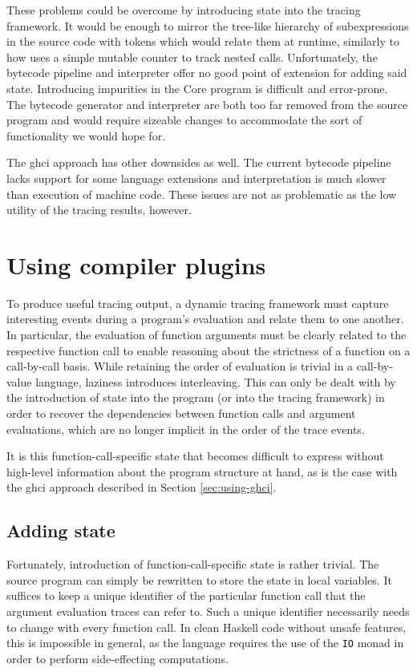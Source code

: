 \documentclass[thesis=B,english]{FITthesis}[2019/12/23]
\newcommand{\hsType}[1]{\texttt{#1}}
\begin{document}
These problems could be overcome by introducing state into the tracing
framework. It would be enough to mirror the tree-like hierarchy of
subexpressions in the source code with tokens which would relate them at
runtime, similarly to how  uses a simple mutable counter to
track nested calls. Unfortunately, the bytecode pipeline and interpreter offer
no good point of extension for adding said state. Introducing impurities in the
Core program is difficult and error-prone. The bytecode generator and
interpreter are both too far removed from the source program and would require
sizeable changes to accommodate the sort of functionality we would hope for.

The \acrshort{ghci} approach has other downsides as well. The current bytecode
pipeline lacks support for some language extensions and interpretation is much
slower than execution of machine code. These issues are not as problematic as
the low utility of the tracing results, however.

\section{Using compiler plugins}
To produce useful tracing output, a dynamic tracing framework must capture
interesting events during a program's evaluation and relate them to one
another. In particular, the evaluation of function arguments must be clearly
related to the respective function call to enable reasoning about the
strictness of a function on a call-by-call basis. While retaining the order of
evaluation is trivial in a call-by-value language, laziness introduces
interleaving. This can only be dealt with by the introduction of state into the
program (or into the tracing framework) in order to recover the dependencies
between function calls and argument evaluations, which are no longer implicit
in the order of the trace events.

It is this function-call-specific state that becomes difficult to express
without high-level information about the program structure at hand, as is the
case with the \acrshort{ghci} approach described in Section
\ref{sec:using-ghci}.

\subsection*{Adding state}
Fortunately, introduction of function-call-specific state is rather trivial.
The source program can simply be rewritten to store the state in local
variables. It suffices to keep a unique identifier of the particular function
call that the argument evaluation traces can refer to. Such a unique identifier
necessarily needs to change with every function call. In clean Haskell code
without unsafe features, this is impossible in general, as the language
requires the use of the \hsType{IO} monad in order to perform side-effecting
computations.
\end{document}
